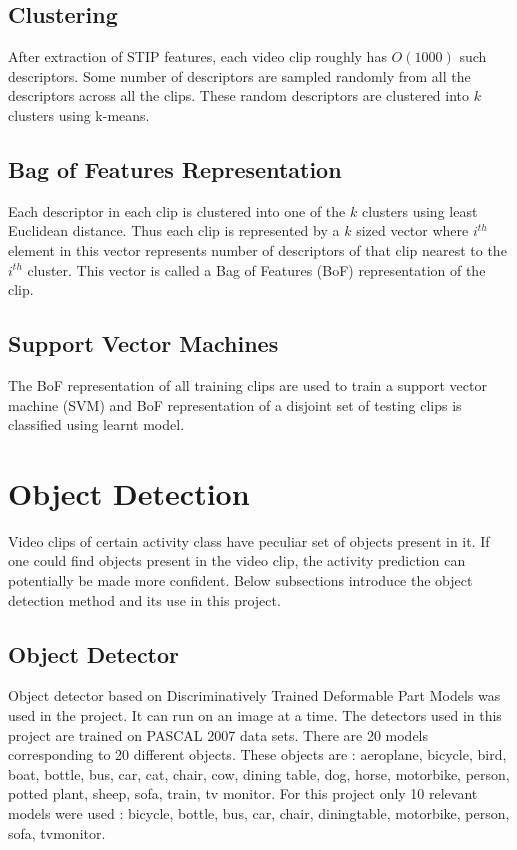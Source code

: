 \subsection{Clustering}
After extraction of STIP features, each video clip roughly has $O(1000)$ such descriptors.
Some number of descriptors are sampled randomly from all the descriptors across all the clips.
These random descriptors are clustered into $k$ clusters using k-means.

\subsection{Bag of Features Representation}
\label{section_BOF}
Each descriptor in each clip is clustered into one of the $k$ clusters using
least Euclidean distance. Thus each clip is represented by a $k$ sized vector
where $i^{th}$ element in this vector represents number of descriptors of that clip 
nearest to the $i^{th}$ cluster. This vector is called a Bag of Features (BoF)
representation of the clip.

\subsection{Support Vector Machines}
\label{AP_definition}
The BoF representation of all training clips are used to train a
support vector machine (SVM) and BoF representation of a disjoint set of testing clips is classified using
learnt model. 

\section{Object Detection}

\label{section_OBJ}


Video clips of certain activity class have peculiar set of objects present in it.
If one could find objects present in the video clip, the activity prediction can 
potentially be made more confident. Below subsections introduce the object detection
method and its use in this project.

\subsection{Object Detector}
\label{section_OBJDET}
Object detector based on Discriminatively Trained Deformable Part Models \cite{voc-release4} was used in
the project. It can run on an image at a time. The detectors used in this project are trained on PASCAL 2007 data sets.
There are 20 models corresponding to 20 different objects.
These objects are : aeroplane, bicycle,
bird, boat, bottle, bus, car, cat, chair, cow, dining table, dog, horse,
motorbike, person, potted plant, sheep, sofa, train, tv monitor.
For this project only 10 relevant models were used : bicycle, bottle, bus, car,
chair, diningtable, motorbike, person, sofa, tvmonitor.

